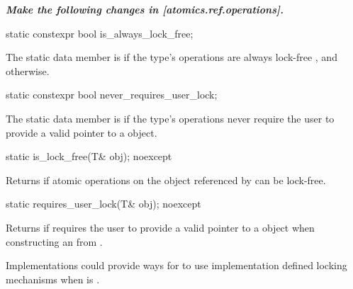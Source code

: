 \textbf{\textit{Make the following changes in [atomics.ref.operations].}} \\

\begin{itemdecl}
static constexpr bool is_always_lock_free;
\end{itemdecl}

\begin{itemdescr}
\pnum
The static data member  is 
if the  type's operations are always lock-free
,
and  otherwise.
\end{itemdescr}

\begin{addedblock}
\begin{itemdecl}
static constexpr bool never_requires_user_lock;
\end{itemdecl}

\begin{itemdescr}
\pnum
The static data member  is 
if the  type's operations never require the user to provide a
valid pointer to a  object. 
\end{itemdescr}
\end{addedblock}

\begin{addedblock}
\begin{itemdecl}
static is_lock_free(T& obj); noexcept
\end{itemdecl}

\begin{itemdescr}
\returns Returns  if atomic operations on the object referenced by
 can be lock-free.
\end{itemdescr}

\begin{itemdecl}
static requires_user_lock(T& obj); noexcept
\end{itemdecl}

\begin{itemdescr}
\returns Returns  if  requires the user to
provide a valid pointer to a  object when constructing an 
 from . 
\begin{note}
Implementations could provide ways for  to use 
implementation defined locking mechanisms when  is .
\end{note}
\end{itemdescr}
\end{addedblock}

